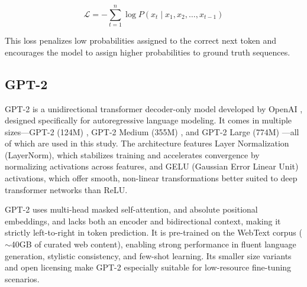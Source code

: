 \begin{equation}
  \mathcal{L} = -\sum_{t=1}^{n} \log P(x_t \mid x_1, x_2, \dots, x_{t-1})
  \label{crossentropy}
\end{equation}

This loss penalizes low probabilities assigned to the correct next token and encourages
the model to assign higher probabilities to ground truth sequences.

\subsection{GPT-2}

GPT-2 is a unidirectional transformer decoder-only model developed by OpenAI \cite{radford2019language}, designed
specifically for autoregressive language modeling. It comes in multiple sizes—GPT-2
(124M) \cite{gpt2}, GPT-2 Medium (355M) \cite{gpt2medium}, and GPT-2 Large (774M) \cite{gpt2large}—all of which
are used in this study. The architecture features Layer Normalization (LayerNorm), which
stabilizes training and accelerates convergence by normalizing activations across features,
and GELU (Gaussian Error Linear Unit) activations, which offer smooth, non-linear transformations
better suited to deep transformer networks than ReLU.

GPT-2 uses multi-head masked self-attention, and absolute positional embeddings, and
lacks both an encoder and bidirectional context, making it strictly left-to-right in token
prediction. It is pre-trained on the WebText corpus ($\sim$40GB of curated web content),
enabling strong performance in fluent language generation, stylistic consistency, and few-shot
learning. Its smaller size variants and open licensing make GPT-2 especially suitable
for low-resource fine-tuning scenarios.

